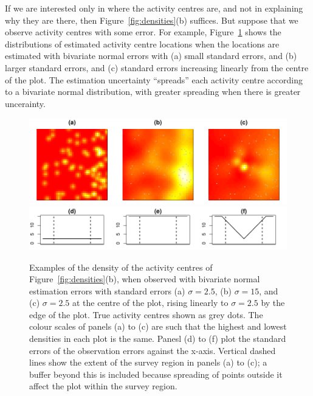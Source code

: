 \documentclass[10pt,a4paper]{article}
\begin{document}
If we are interested only in where the activity centres are, and not in explaining why they are there, then Figure~\ref{fig:densities}(b) suffices. But suppose that we observe activity centres with some error. For example, Figure~\ref{fig:acesterr} shows the distributions of estimated activity centre locations when the locations are estimated with bivariate normal errors with (a) small standard errors, and (b) larger standard errors, and (c) standard errors increasing linearly from the centre of the plot. The estimation uncertainty ``spreads'' each activity centre according to a bivariate normal distribution, with greater spreading when there is greater uncerainty.

\begin{figure}[htbp]
\centering
\includegraphics[width=\textwidth]{acesterr.pdf}
\includegraphics[width=\textwidth]{sigmas.pdf}
\caption{Examples of the density of the activity centres of Figure~\ref{fig:densities}(b), when observed with bivariate normal estimation errors with standard errors (a) $\sigma=2.5$, (b) $\sigma=15$, and (c) $\sigma=2.5$ at the centre of the plot, rising linearly to $\sigma=2.5$ by the edge of the plot. True activity centres shown as grey dots. The colour scales of panels (a) to (c) are such that the highest and lowest densities in each plot is the same.
Panesl (d) to (f) plot the standard errors of the observation errors against the x-axis. Vertical dashed lines show the extent of the survey region in panels (a) to (c); a buffer beyond this is included because spreading of points outside it affect the plot within the survey region.}
\label{fig:acesterr}
\end{figure}
\end{document}
